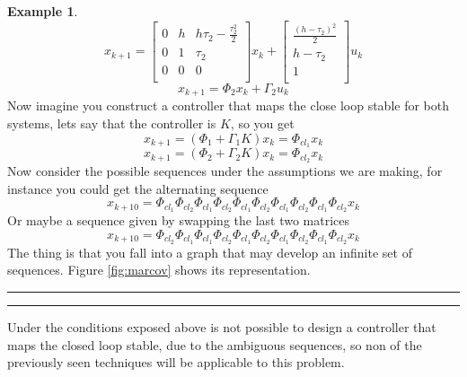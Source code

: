 \documentclass[nols]{tufte-handout}
\theoremstyle{definition}
\newtheorem{exmp}{Example}[section]
\begin{document}
\begin{exmp}
\[
    x_{k+1}=\begin{bmatrix}
        0 & h & h\tau_2-\frac{\tau_2^2}{2}\\
        0 & 1 & \tau_2\\
        0 & 0 & 0\\
    \end{bmatrix}x_{k}+\begin{bmatrix}
        \frac{(h - \tau_2)^2}{2} \\ 
        h-\tau_2\\
        1\\
    \end{bmatrix}u_{k}
\]
\[
    x_{k+1}=\Phi_2x_{k}+\Gamma_{2}u_k
\]
Now imagine you construct a controller that maps the close loop stable for both systems, lets say that the controller is $K$, so you get
\[
x_{k+1}=(\Phi_1+\Gamma_1K)x_k=\Phi_{cl_1}x_k
\]
\[
x_{k+1}=(\Phi_2+\Gamma_2K)x_k=\Phi_{cl_2}x_k
\]
Now consider the possible sequences under the assumptions we are making, for instance you could get the alternating sequence
\[
x_{k+10}=\Phi_{cl_1}\Phi_{cl_2}\Phi_{cl_1}\Phi_{cl_2}\Phi_{cl_1}\Phi_{cl_2}\Phi_{cl_1}\Phi_{cl_2}\Phi_{cl_1}\Phi_{cl_2}x_k
\]
Or maybe a sequence given by swapping the last two matrices
\[
x_{k+10}=\Phi_{cl_2}\Phi_{cl_1}\Phi_{cl_1}\Phi_{cl_2}\Phi_{cl_1}\Phi_{cl_2}\Phi_{cl_1}\Phi_{cl_2}\Phi_{cl_1}\Phi_{cl_2}x_k
\]
The thing is that you fall into a graph that may develop an infinite set of sequences. Figure \ref{fig:marcov} shows its representation.

\begin{marginfigure}
    \centering
    
    \caption{This is the graph associated with the example we are proposing, the probability of having $\Phi_1$ after happening $\Phi_2$ is $0.5$, while the reverse case is symmetric. In this situation you cannot predict the sequence of the matrices neither a tendency in the sequences that we get in the execution }
    \label{fig:marcov}
\end{marginfigure}
\end{exmp}
\hrule
\hrule
\vspace{0.5cm}


Under the conditions exposed above is not possible to design a controller that maps the closed loop stable, due to the ambiguous sequences, so non of the previously seen techniques will be applicable to this problem.
\end{document}
